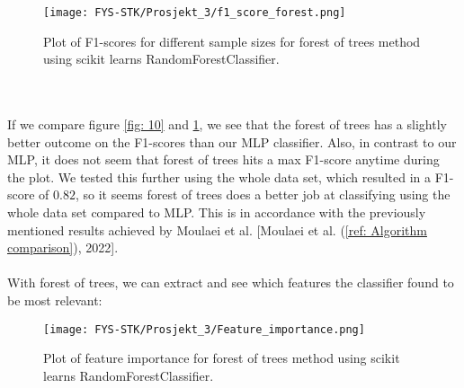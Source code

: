 \documentclass[english,notitlepage,reprint,nofootinbib]{revtex4-1}  %
\begin{document}
\begin{figure}[H]
    \centering
    \texttt{[image: FYS-STK/Prosjekt\_3/f1\_score\_forest.png]}
    \caption{Plot of F1-scores for different sample sizes for forest of trees method using scikit learns RandomForestClassifier.}
    \label{fig: 11}
\end{figure}
\\
\\
If we compare figure \ref{fig: 10} and \ref{fig: 11}, we see that the forest of trees has a slightly better outcome on the F1-scores than our MLP classifier. Also, in contrast to our MLP, it does not seem that forest of trees hits a max F1-score anytime during the plot. We tested this further using the whole data set, which resulted in a F1-score of $0.82$, so it seems forest of trees does a better job at classifying using the whole data set compared to MLP. This is in accordance with the previously mentioned results achieved by Moulaei et al. [Moulaei et al. (\ref{ref: Algorithm comparison}), 2022]. %
\\
\\
With forest of trees, we can extract and see which features the classifier found to be most relevant:
\begin{figure}[H]
    \centering
    \texttt{[image: FYS-STK/Prosjekt\_3/Feature\_importance.png]}
    \caption{Plot of feature importance for forest of trees method using scikit learns RandomForestClassifier.}
    \label{fig: 12}
\end{figure}
\\
\\
\end{document}
